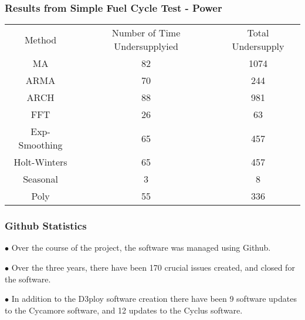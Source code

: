 \begin{frame}
  \frametitle{Results from Simple Fuel Cycle Test - Power}
        \begin{tabular}{c c c}
        Method & Number of Time Undersupplyied & Total Undersupply \\
        MA & 82 & 1074 \\
        ARMA& 70 & 244 \\
        ARCH & 88 & 981 \\
        FFT & 26 & 63 \\
        Exp-Smoothing & 65 & 457 \\
        Holt-Winters & 65 & 457 \\
        Seasonal & 3 & 8 \\
        Poly & 55 & 336
        \end{tabular}
\end{frame}

\begin{frame}
  \frametitle{Github Statistics}
    \item[$\bullet$] Over the course of the project, the software was 
                    managed using Github.
    \item[$\bullet$] Over the three years, there have been 170 crucial
                     issues created, and closed for the software. 
    \item[$\bullet$] In addition to the D3ploy software creation there
                     have been 9 software updates to the Cycamore software,
                     and 12 updates to the Cyclus software.             
\end{frame}
